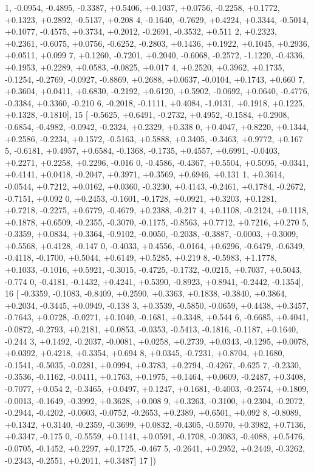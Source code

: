 \begin{DoxyCode}
      1, -0.0954, -0.4895, -0.3387, +0.5406, +0.1037, +0.0756, -0.2258, +0.1772, +0.1323, +0.2892, -0.5137, +0.208
      4, -0.1640, -0.7629, +0.4224, +0.3344, -0.5014, +0.1077, -0.4575, +0.3734, +0.2012, -0.2691, -0.3532, +0.511
      2, +0.2323, +0.2361, -0.6075, +0.0756, -0.6252, -0.2803, +0.1436, +0.1922, +0.1045, +0.2936, +0.0511, +0.099
      7, +0.1260, -0.7201, +0.2040, -0.6068, -0.2572, -1.1220, -0.4336, +0.1953, +0.2289, +0.0583, -0.0825, +0.017
      4, +0.2520, +0.3962, +0.1735, -0.1254, -0.2769, -0.0927, -0.8869, +0.2688, +0.0637, -0.0104, +0.1743, +0.660
      7, +0.3604, +0.0411, +0.6830, -0.2192, +0.6120, +0.5902, -0.0692, +0.0640, -0.4776, -0.3384, +0.3360, -0.210
      6, -0.2018, -0.1111, +0.4084, -1.0131, +0.1918, +0.1225, +0.1328, -0.1810],
15 [ -0.5625, +0.6491, -0.2732, +0.4952, -0.1584, +0.2908, -0.6854, -0.4982, -0.0942, -0.2324, +0.2329, +0.338
      0, +0.4047, +0.8220, +0.1344, +0.2586, -0.2234, +0.1572, -0.5163, +0.5888, +0.3405, -0.3463, +0.9772, +0.167
      5, -0.6181, +0.4957, +0.6584, -0.1368, -0.1735, +0.4557, +0.6991, -0.0403, +0.2271, +0.2258, +0.2296, -0.016
      0, -0.4586, -0.4367, +0.5504, +0.5095, -0.0341, +0.4141, +0.0418, -0.2047, +0.3971, +0.3569, +0.6946, +0.131
      1, +0.3614, -0.0544, +0.7212, +0.0162, +0.0360, -0.3230, +0.4143, -0.2461, +0.1784, -0.2672, -0.7151, +0.092
      0, +0.2453, -0.1601, -0.1728, +0.0921, +0.3203, +0.1281, +0.7218, -0.2275, +0.6779, -0.4679, +0.2388, -0.217
      4, +0.1108, -0.2124, +0.1118, +0.1878, +0.6509, -0.2355, -0.3070, -0.1175, -0.8563, +0.7712, +0.7216, +0.270
      5, -0.3359, +0.0834, +0.3364, -0.9102, -0.0050, -0.2038, -0.3887, -0.0003, +0.3009, +0.5568, +0.4128, -0.147
      0, -0.4033, +0.4556, -0.0164, +0.6296, -0.6479, -0.6349, -0.4118, -0.1700, +0.5044, +0.6149, +0.5285, +0.219
      8, -0.5983, +1.1778, +0.1033, -0.1016, +0.5921, -0.3015, -0.4725, -0.1732, -0.0215, +0.7037, +0.5043, -0.774
      0, -0.4181, -0.1432, +0.4241, +0.5390, -0.8923, +0.8941, -0.2442, -0.1354],
16 [ -0.3359, -0.1083, -0.8409, +0.2590, +0.3363, +0.1838, -0.3840, +0.3864, +0.2034, -0.3445, +0.0949, -0.138
      3, +0.3539, -0.5850, -0.0659, +0.4438, +0.3457, -0.7643, +0.0728, -0.0271, +0.1040, -0.1681, +0.3348, +0.544
      6, -0.6685, +0.4041, -0.0872, -0.2793, +0.2181, +0.0853, -0.0353, -0.5413, -0.1816, -0.1187, +0.1640, -0.244
      3, +0.1492, -0.2037, -0.0081, +0.0258, +0.2739, +0.0343, -0.1295, +0.0078, +0.0392, +0.4218, +0.3354, +0.694
      8, +0.0345, -0.7231, +0.8704, +0.1680, -0.1541, -0.5035, -0.0281, +0.0994, +0.3783, +0.2794, -0.4267, -0.625
      7, -0.2330, -0.3536, -0.1162, -0.0411, +0.1763, +0.1975, +0.1464, +0.0609, -0.2487, +0.3408, -0.7077, +0.054
      2, -0.3465, +0.0497, +0.1247, +0.1681, -0.4003, -0.2574, +0.1809, -0.0013, -0.1649, -0.3992, +0.3628, +0.008
      9, +0.3263, -0.3100, +0.2304, -0.2072, -0.2944, -0.4202, -0.0603, -0.0752, -0.2653, +0.2389, +0.6501, +0.092
      8, -0.8089, +0.1342, +0.3140, -0.2359, -0.3699, +0.0832, -0.4305, -0.5970, +0.3982, +0.7136, +0.3347, -0.175
      0, -0.5559, +0.1141, +0.0591, -0.1708, -0.3083, -0.4088, +0.5476, -0.0705, -0.1452, +0.2297, +0.1725, -0.467
      5, -0.2641, +0.2952, +0.2449, -0.3262, -0.2343, -0.2551, +0.2011, +0.3487]
17 ])
\end{DoxyCode}
